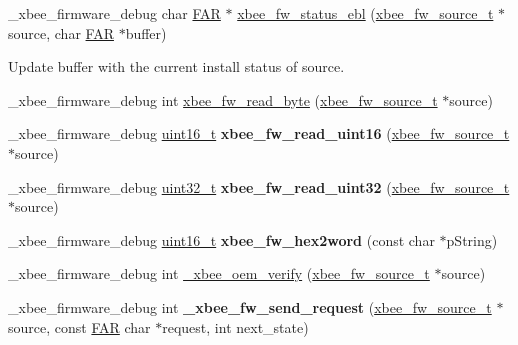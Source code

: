 \begin{DoxyCompactItemize}
\-\_\-xbee\-\_\-firmware\-\_\-debug char \hyperlink{group__hal_gaef060b3456fdcc093a7210a762d5f2ed}{F\-A\-R} $\ast$ \hyperlink{group__xbee__firmware_ga8bee6e4bb7564c51bb38129e97a12e99}{xbee\-\_\-fw\-\_\-status\-\_\-ebl} (\hyperlink{structxbee__fw__source__t}{xbee\-\_\-fw\-\_\-source\-\_\-t} $\ast$source, char \hyperlink{group__hal_gaef060b3456fdcc093a7210a762d5f2ed}{F\-A\-R} $\ast$buffer)
\begin{DoxyCompactList}\small\item\em \begin{DoxyVerb}  Update \a buffer with the current install status of \a source.\end{DoxyVerb}
 \end{DoxyCompactList}\item 
\-\_\-xbee\-\_\-firmware\-\_\-debug int \hyperlink{group__xbee__firmware_ga279def556401f533d798bb3896302ced}{xbee\-\_\-fw\-\_\-read\-\_\-byte} (\hyperlink{structxbee__fw__source__t}{xbee\-\_\-fw\-\_\-source\-\_\-t} $\ast$source)
\item 
\hypertarget{group__xbee__firmware_ga746388cd011a0d01a71d8165f218ac0c}{\-\_\-xbee\-\_\-firmware\-\_\-debug \hyperlink{group__hal_ga5a8b2dc9e45a9ee81a94ef304fb62505}{uint16\-\_\-t} {\bfseries xbee\-\_\-fw\-\_\-read\-\_\-uint16} (\hyperlink{structxbee__fw__source__t}{xbee\-\_\-fw\-\_\-source\-\_\-t} $\ast$source)}\label{group__xbee__firmware_ga746388cd011a0d01a71d8165f218ac0c}

\item 
\hypertarget{group__xbee__firmware_gac6ee0eef9cb2fad06cdb35e7efbfa4b7}{\-\_\-xbee\-\_\-firmware\-\_\-debug \hyperlink{group__hal__dos_ga09a1e304d66d35dd47daffee9731edaa}{uint32\-\_\-t} {\bfseries xbee\-\_\-fw\-\_\-read\-\_\-uint32} (\hyperlink{structxbee__fw__source__t}{xbee\-\_\-fw\-\_\-source\-\_\-t} $\ast$source)}\label{group__xbee__firmware_gac6ee0eef9cb2fad06cdb35e7efbfa4b7}

\item 
\hypertarget{group__xbee__firmware_ga435d274639214c2d05e85602bb5753b0}{\-\_\-xbee\-\_\-firmware\-\_\-debug \hyperlink{group__hal_ga5a8b2dc9e45a9ee81a94ef304fb62505}{uint16\-\_\-t} {\bfseries xbee\-\_\-fw\-\_\-hex2word} (const char $\ast$p\-String)}\label{group__xbee__firmware_ga435d274639214c2d05e85602bb5753b0}

\item 
\-\_\-xbee\-\_\-firmware\-\_\-debug int \hyperlink{group__xbee__firmware_ga06368ad0d6cc0d4e92dbf36f8b233f90}{\-\_\-xbee\-\_\-oem\-\_\-verify} (\hyperlink{structxbee__fw__source__t}{xbee\-\_\-fw\-\_\-source\-\_\-t} $\ast$source)
\item 
\hypertarget{group__xbee__firmware_ga2ab185ce19159e57ca4666300be1a94b}{\-\_\-xbee\-\_\-firmware\-\_\-debug int {\bfseries \-\_\-xbee\-\_\-fw\-\_\-send\-\_\-request} (\hyperlink{structxbee__fw__source__t}{xbee\-\_\-fw\-\_\-source\-\_\-t} $\ast$source, const \hyperlink{group__hal_gaef060b3456fdcc093a7210a762d5f2ed}{F\-A\-R} char $\ast$request, int next\-\_\-state)}\label{group__xbee__firmware_ga2ab185ce19159e57ca4666300be1a94b}


\end{DoxyCompactItemize}
